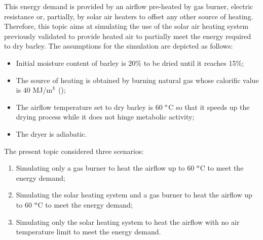 This energy demand is provided by an airflow pre-heated by gas burner, electric resistance or, partially, by solar air heaters to offset any other source of heating. Therefore, this topic aims at simulating the use of the solar air heating system previously validated to provide heated air to partially meet the energy required to dry barley. The assumptions for the simulation are depicted as follows:


\begin{itemize}
	\item Initial moisture content of barley is 20\% to be dried until it reaches 15\%;
	\item The source of heating is obtained by burning natural gas whose calorific value is 40 MJ/m$^{\rm{3}}$ (\cite{GOVUK2022});
	\item The airflow temperature set to dry barley is 60 $^{\rm{o}}$C so that it speeds up the drying process while it does not hinge metabolic activity;
	\item The dryer is adiabatic.
\end{itemize}

The present topic considered three scenarios: 
\begin{enumerate}
	\item Simulating only a gas burner to heat the airflow up to 60 $^{\rm{o}}$C to meet the energy demand;
	\item Simulating the solar heating system and a gas burner to heat the airflow up to 60 $^{\rm{o}}$C to meet the energy demand;
	\item Simulating only the solar heating system to heat the airflow with no air temperature limit to meet the energy demand.
\end{enumerate}


